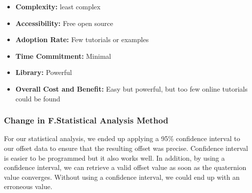 			\begin{itemize}
				\item \textbf{Complexity:}
				least complex

				\item \textbf{Accessibility:}
				Free open source

				\item \textbf{Adoption Rate:}
				Few tutorials or examples

				\item \textbf{Time Commitment:}
				Minimal

				\item \textbf{Library:}
				Powerful
				
				\item \textbf{Overall Cost and Benefit:}
				Easy but powerful, but too few online tutorials could be found\\
			\end{itemize}

		\subsubsection{Change in F.Statistical Analysis Method}
			For our statistical analysis, we ended up applying a 95\% confidence interval to our offset data to ensure that the resulting offset was precise. Confidence interval is easier to be programmed but it also works well. In addition, by using a confidence interval, we can retrieve a valid offset value as soon as the quaternion value converges. Without using a confidence interval, we could end up with an erroneous value.











